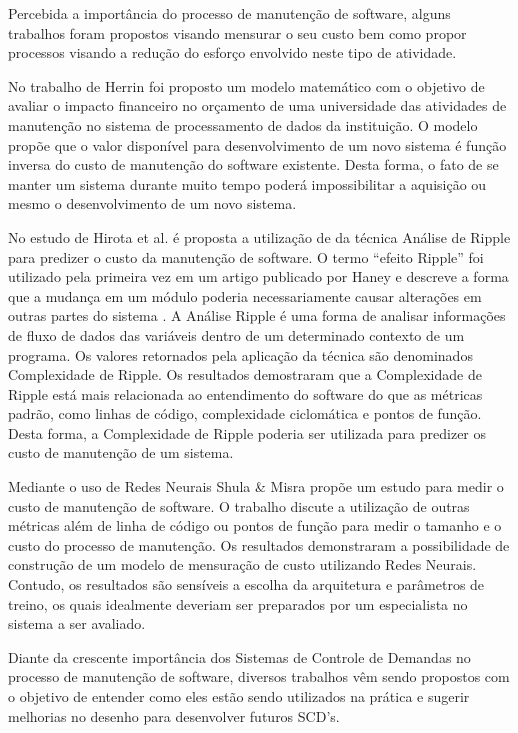 \documentclass[msc,proposal,hidelot,hideabstract]{ppgccufmg} %
\begin{document}
Percebida a importância do processo de manutenção de software, alguns trabalhos foram propostos visando mensurar o seu custo bem como propor
processos visando a redução do esforço envolvido neste tipo de atividade.

No trabalho de Herrin \cite{Herrin:1985:SMC:323287.323383} foi proposto um modelo matemático com o
objetivo de avaliar o impacto financeiro no orçamento de uma universidade das atividades de manutenção no sistema
de processamento de dados da instituição. O modelo propõe que o valor disponível para desenvolvimento de um novo sistema é
função inversa do custo de manutenção do software existente. Desta forma, o
fato de se manter um sistema durante muito tempo poderá impossibilitar a aquisição ou mesmo o desenvolvimento de um novo sistema.

No estudo de Hirota et al. \cite{hirota1994approach} é proposta a utilização de
da técnica Análise de Ripple para predizer o custo da manutenção de software. O
termo ``efeito Ripple'' foi utilizado pela primeira vez em um artigo publicado
por Haney \cite{haney1972module} e descreve a forma que a mudança em um módulo poderia
necessariamente causar alterações em outras partes do sistema
\cite{bilal2005using}. A Análise Ripple é uma forma de analisar informações de fluxo de dados das variáveis
dentro de um determinado contexto de um programa. Os valores retornados pela
aplicação da técnica são denominados Complexidade de Ripple. Os resultados
demostraram que a Complexidade de Ripple está mais relacionada ao entendimento do
software do que as métricas padrão, como linhas de código, complexidade
ciclomática e pontos de função. Desta forma, a Complexidade de Ripple poderia ser
utilizada para predizer os custo de manutenção de um sistema.

Mediante o uso de Redes Neurais Shula \& Misra
\cite{Shukla:2008:ESM:1342211.1342232} propõe um estudo para medir o custo de
manutenção de software. O trabalho discute a utilização de outras métricas além
de linha de código ou pontos de função para medir o tamanho e o custo do
processo de manutenção. Os resultados demonstraram a possibilidade de
construção de um modelo de mensuração de custo utilizando Redes
Neurais. Contudo, os resultados são sensíveis a escolha da arquitetura e
parâmetros de treino, os quais idealmente deveriam ser preparados por um
especialista no sistema a ser avaliado.

Diante da crescente importância dos Sistemas de Controle de Demandas no processo de manutenção de software, diversos
trabalhos vêm sendo propostos com o objetivo de entender como eles estão sendo
utilizados na prática e sugerir melhorias no desenho para desenvolver futuros SCD's.
\end{document}
